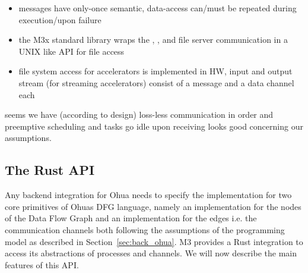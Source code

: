 \begin{itemize}
\begin{itemize}
        \item messages have only-once semantic, data-access can/must be repeated during execution/upon failure
        \item the M3x standard library wraps the , ,  and  file server communication in a UNIX like API for file access 
        \item file system access for accelerators is implemented in HW, input and output stream (for streaming accelerators) consist of a message and a data channel each
    \end{itemize}
\end{itemize}
\means seems we have (according to design) loss-less communication in order and preemptive scheduling and tasks go idle upon receiving \means looks good concerning our assumptions. 

\subsection{The Rust API}
Any backend integration for Ohua needs to specify the implementation for two core primitives of Ohuas DFG language, namely an implementation for the nodes of the Data Flow Graph and an implementation for the edges i.e. the communication channels both following the assumptions of the programming model as described in Section~\ref{sec:back_ohua}. M3 provides a Rust integration to access its abstractions of processes and channels. We will now describe the main features of this API. \\

